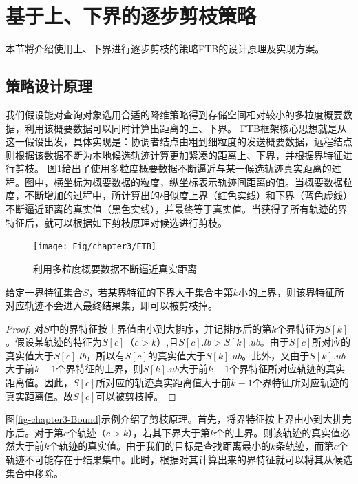 \section{基于上、下界的逐步剪枝策略}\label{sec-c4-FTB}
本节将介绍使用上、下界进行逐步剪枝的策略FTB的设计原理及实现方案。
\subsection{策略设计原理}
我们假设能对查询对象选用合适的降维策略得到存储空间相对较小的多粒度概要数据，利用该概要数据可以同时计算出距离的上、下界。
FTB框架核心思想就是从这一假设出发，具体实现是：协调者结点由粗到细粒度的发送概要数据，远程结点则根据该数据不断为本地候选轨迹计算更加紧凑的距离上、下界，并根据界特征进行剪枝。
图\ref{fig-chapter3-FTB}给出了使用多粒度概要数据不断逼近与某一候选轨迹真实距离的过程。图中，横坐标为概要数据的粒度，纵坐标表示轨迹间距离的值。当概要数据粒度，不断增加的过程中，所计算出的相似度上界（红色实线）和下界（蓝色虚线）不断逼近距离的真实值（黑色实线），并最终等于真实值。当获得了所有轨迹的界特征后，就可以根据如下剪枝原理对候选进行剪枝。
\begin{figure}
	\centering
	\texttt{[image: Fig/chapter3/FTB]}
	\caption{利用多粒度概要数据不断逼近真实距离}
	\label{fig-chapter3-FTB}
\end{figure}



\begin{lemma}
	给定一界特征集合$S$，若某界特征的下界大于集合中第$k$小的上界，则该界特征所对应轨迹不会进入最终结果集，即可以被剪枝掉。
\end{lemma}
\begin{proof}
	对$S$中的界特征按上界值由小到大排序，并记排序后的第$k$个界特征为$S[k]$。假设某轨迹的特征为$S[c]$（$c>k$）,且$S[c].lb>S[k].ub$。由于$S[c]$所对应的真实值大于$S[c].lb$，所以有$S[c]$的真实值大于$S[k].ub$。此外，又由于$S[k].ub$大于前$k-1$个界特征的上界，则$S[k].ub$大于前$k-1$个界特征所对应轨迹的真实距离值。因此，$S[c]$所对应的轨迹真实距离值大于前$k-1$个界特征所对应轨迹的真实距离值。故$S[c]$可以被剪枝掉。
\end{proof}
图\ref{fig-chapter3-Bound}示例介绍了剪枝原理。首先，将界特征按上界由小到大排完序后。对于第$c$个轨迹（$c>k$），若其下界大于第$k$个的上界。则该轨迹的真实值必然大于前$k$个轨迹的真实值。由于我们的目标是查找距离最小的$k$条轨迹，而第$c$个轨迹不可能存在于结果集中。此时，根据对其计算出来的界特征就可以将其从候选集合中移除。

